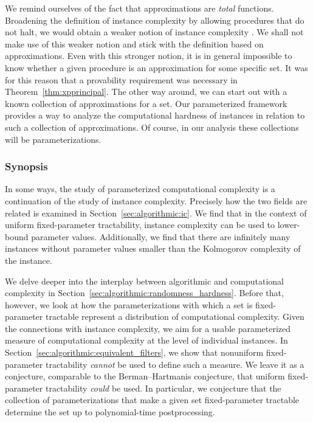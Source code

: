 We remind ourselves of the fact that approximations are \emph{total} functions.
Broadening the definition of instance complexity by allowing procedures that do not halt, we would obtain a weaker notion of instance complexity \parencite{kummer1996kolmogorov}.
We shall not make use of this weaker notion and stick with the definition based on approximations.
Even with this stronger notion, it is in general impossible to know whether a given procedure is an approximation for some specific set.
It was for this reason that a provability requirement was necessary in Theorem~\ref{thm:xpprincipal}.
The other way around, we can start out with a known collection of approximations for a set.
Our parameterized framework provides a way to analyze the computational hardness of instances in relation to such a collection of approximations.
Of course, in our analysis these collections will be parameterizations.

\subsubsection{Synopsis}
In some ways, the study of parameterized computational complexity is a continuation of the study of instance complexity.
Precisely how the two fields are related is examined in Section~\ref{sec:algorithmic:ic}.
We find that in the context of uniform fixed-parameter tractability, instance complexity can be used to lower-bound parameter values.
Additionally, we find that there are infinitely many instances without parameter values smaller than the Kolmogorov complexity of the instance.

We delve deeper into the interplay between algorithmic and computational complexity in Section~\ref{sec:algorithmic:randomness_hardness}.
Before that, however, we look at how the parameterizations with which a set is fixed-parameter tractable represent a distribution of computational complexity.
Given the connections with instance complexity, we aim for a usable parameterized measure of computational complexity at the level of individual instances.
In Section~\ref{sec:algorithmic:equivalent_filters}, we show that nonuniform fixed-parameter tractability \emph{cannot} be used to define such a measure.
We leave it as a conjecture, comparable to the Berman--Hartmanis conjecture, that uniform fixed-parameter tractability \emph{could} be used.
In particular, we conjecture that the collection of parameterizations that make a given set fixed-parameter tractable determine the set up to polynomial-time postprocessing.

